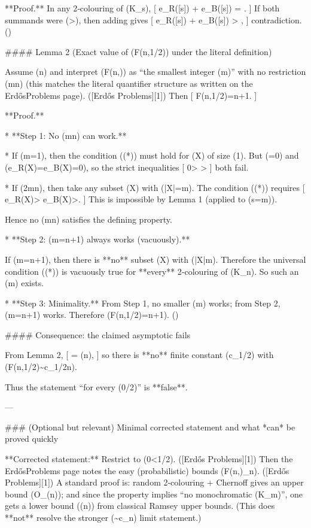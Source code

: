 **Proof.**
In any 2‑colouring of (K_s),
[
e_R([s]) + e_B([s]) = .
]
If both summands were (>), then adding gives
[
e_R([s]) + e_B([s]) > ,
]
contradiction. (\square)

#### Lemma 2 (Exact value of (F(n,1/2)) under the literal definition)

Assume (n) and interpret (F(n,\alpha)) as “the smallest integer (m)” with no restriction (m\le n) (this matches the literal quantifier structure as written on the ErdősProblems page). ([Erdős Problems][1])
Then
[
F(n,1/2)=n+1.
]

**Proof.**

* **Step 1: No (m\le n) can work.**

* If (m=1), then the condition ((*)) must hold for (X) of size (1). But (=0) and (e_R(X)=e_B(X)=0), so the strict inequalities
[
0> 
\quad{}> 
]
both fail.

* If (2\le m\le n), then take any subset (X\subseteq[n]) with (|X|=m). The condition ((*)) requires
[
e_R(X)>
\quad{}\quad
e_B(X)>.
]
This is impossible by Lemma 1 (applied to (s=m)).

Hence no (m\le n) satisfies the defining property.

* **Step 2: (m=n+1) always works (vacuously).**

If (m=n+1), then there is **no** subset (X\subseteq[n]) with (|X|\ge m). Therefore the universal condition ((*)) is vacuously true for **every** 2‑colouring of (K_n). So such an (m) exists.

* **Step 3: Minimality.**
From Step 1, no smaller (m) works; from Step 2, (m=n+1) works. Therefore (F(n,1/2)=n+1). (\square)

#### Consequence: the claimed asymptotic fails

From Lemma 2,
[
=\longrightarrow \infty
\quad(n\to\infty),
]
so there is **no** finite constant (c_{1/2}) with (F(n,1/2)\sim c_{1/2}\log n).

Thus the statement “for every (0\le\alpha{}/2)” is **false**.

---

### (Optional but relevant) Minimal corrected statement and what *can* be proved quickly

**Corrected statement:** Restrict to (0\le\alpha<1/2). ([Erdős Problems][1])
Then the ErdősProblems page notes the easy (probabilistic) bounds (F(n,\alpha)\asymp_\alpha \log n). ([Erdős Problems][1])
A standard proof is: random 2‑colouring + Chernoff gives an upper bound (O_\alpha(\log n)); and since the property implies “no monochromatic (K_m)”, one gets a lower bound (\Omega(\log n)) from classical Ramsey upper bounds. (This does **not** resolve the stronger (\sim c_\alpha\log n) limit statement.)

